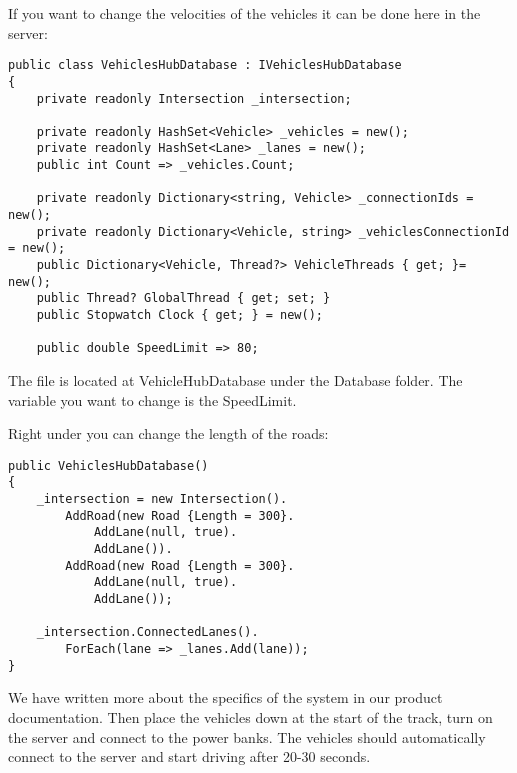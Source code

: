 If you want to change the velocities of the vehicles it can be done here in the server:
\begin{lstlisting}
public class VehiclesHubDatabase : IVehiclesHubDatabase
{
	private readonly Intersection _intersection;
	
	private readonly HashSet<Vehicle> _vehicles = new();
	private readonly HashSet<Lane> _lanes = new();
	public int Count => _vehicles.Count;
	
	private readonly Dictionary<string, Vehicle> _connectionIds = new();
	private readonly Dictionary<Vehicle, string> _vehiclesConnectionId = new();
	public Dictionary<Vehicle, Thread?> VehicleThreads { get; }= new();
	public Thread? GlobalThread { get; set; }
	public Stopwatch Clock { get; } = new();
	
	public double SpeedLimit => 80;
\end{lstlisting}

The file is located at VehicleHubDatabase under the Database folder. The variable you want to change is the SpeedLimit.

Right under you can change the length of the roads:
\begin{lstlisting}
public VehiclesHubDatabase()
{
	_intersection = new Intersection().
		AddRoad(new Road {Length = 300}.
			AddLane(null, true).
			AddLane()).
		AddRoad(new Road {Length = 300}.
			AddLane(null, true).
			AddLane());
	
	_intersection.ConnectedLanes().
		ForEach(lane => _lanes.Add(lane));
}
\end{lstlisting}

We have written more about the specifics of the system in our product documentation.
Then place the vehicles down at the start of the track, turn on the server and connect to the power banks. The vehicles should automatically connect to the server and start driving after 20-30 seconds.
